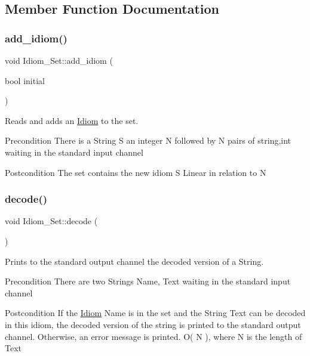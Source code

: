\subsection{Member Function Documentation}
\mbox{\label{classIdiom__Set_af3104a11bb72e006c91961090b257148}} 
\subsubsection{\texorpdfstring{add\+\_\+idiom()}{add\_idiom()}}
{\footnotesize\ttfamily void Idiom\+\_\+\+Set\+::add\+\_\+idiom (\begin{DoxyParamCaption}\item[{bool}]{initial }\end{DoxyParamCaption})}



Reads and adds an \hyperlink{classIdiom}{Idiom} to the set. 

\begin{DoxyPrecond}{Precondition}
There is a String S an integer N followed by N pairs of string,int waiting in the standard input channel 
\end{DoxyPrecond}
\begin{DoxyPostcond}{Postcondition}
The set contains the new idiom S  Linear in relation to N 
\end{DoxyPostcond}
\mbox{\label{classIdiom__Set_a1b8a15c38adcc4bf7672f0548ede8114}} 
\subsubsection{\texorpdfstring{decode()}{decode()}}
{\footnotesize\ttfamily void Idiom\+\_\+\+Set\+::decode (\begin{DoxyParamCaption}{ }\end{DoxyParamCaption})}



Prints to the standard output channel the decoded version of a String. 

\begin{DoxyPrecond}{Precondition}
There are two Strings Name, Text waiting in the standard input channel 
\end{DoxyPrecond}
\begin{DoxyPostcond}{Postcondition}
If the \hyperlink{classIdiom}{Idiom} Name is in the set and the String Text can be decoded in this idiom, the decoded version of the string is printed to the standard output channel. Otherwise, an error message is printed.  O( N ), where N is the length of Text 
\end{DoxyPostcond}
\mbox{\label{classIdiom__Set_ae29dfe841bab8b273139d2fc92a93d88}} 
